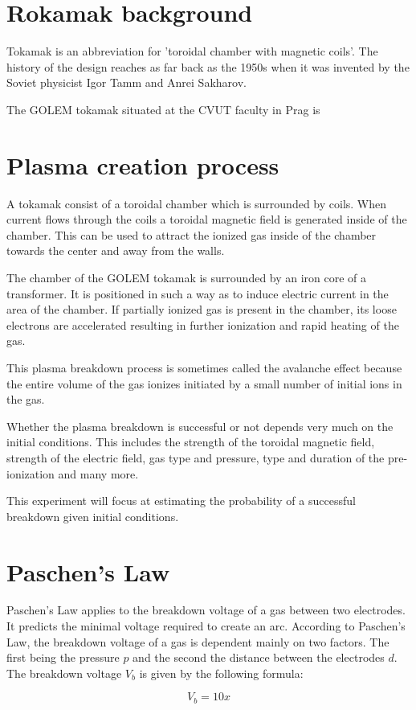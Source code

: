 \section{Rokamak background}

Tokamak is an abbreviation for 'toroidal chamber with magnetic coils'.
The history of the design reaches as far back as the 1950s when it was invented by the Soviet physicist Igor Tamm and Anrei Sakharov. 

The GOLEM tokamak situated at the CVUT faculty in Prag is


\section{Plasma creation process}
A tokamak consist of a toroidal chamber which is surrounded by coils. When current flows through the coils a toroidal magnetic field is generated inside of the chamber. This can be used to attract the ionized gas inside of the chamber towards the center and away from the walls.


The chamber of the GOLEM tokamak is surrounded by an iron core of a transformer. It is positioned in such a way as to induce electric current in the area of the chamber. If partially ionized gas is present in the chamber, its loose electrons are accelerated resulting in further ionization and rapid heating of the gas.

This plasma breakdown process is sometimes called the avalanche effect because the entire volume of the gas ionizes initiated by a small number of initial ions in the gas.

Whether the plasma breakdown is successful or not depends very much on the initial conditions. This includes the strength of the toroidal magnetic field, strength of the electric field, gas type and pressure, type and duration of the pre-ionization and many more.

This experiment will focus at estimating the probability of a successful breakdown given initial conditions. 

\section{Paschen's Law}
Paschen's Law applies to the breakdown voltage of a gas between two electrodes. It predicts the minimal voltage required to create an arc. According to Paschen's Law, the breakdown voltage of a gas is dependent mainly on two factors. The first being the pressure $p$ and the second the distance between the electrodes $d$. The breakdown voltage $V_{b}$ is given by the following formula:

$$ V_{b}={10}{x} $$